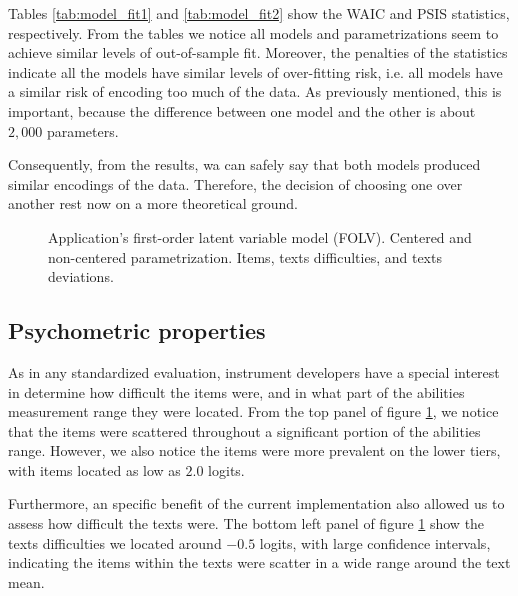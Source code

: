 Tables \ref{tab:model_fit1} and \ref{tab:model_fit2} show the WAIC and PSIS statistics, respectively. From the tables we notice all models and parametrizations seem to achieve similar levels of out-of-sample fit. Moreover, the penalties of the statistics indicate all the models have similar levels of over-fitting risk, i.e. all models have a similar risk of encoding too much of the data. As previously mentioned, this is important, because the difference between one model and the other is about $2,000$ parameters.

Consequently, from the results, wa can safely say that both models produced similar encodings of the data. Therefore, the decision of choosing one over another rest now on a more theoretical ground.

%
\begin{figure}[H]
	\centering
	\begin{subfigure}
		\texttt{[image: FOLV\_recovery\_items]}
	\end{subfigure}
	\begin{subfigure}
		\texttt{[image: FOLV\_recovery\_texts]}
	\end{subfigure}
	\caption[Application's first-order latent variable model (FOLV). Centered and non-centered parametrization. Items, and texts difficulties, and texts deviations.]%
	{Application's first-order latent variable model (FOLV). Centered and non-centered parametrization. Items, texts difficulties, and texts deviations.}
	\label{fig:FOLV_CE.NC_recovery}
\end{figure}

\subsection{Psychometric properties}

As in any standardized evaluation, instrument developers have a special interest in determine how difficult the items were, and in what part of the abilities measurement range they were located. From the top panel of figure \ref{fig:FOLV_CE.NC_recovery}, we notice that the items were scattered throughout a significant portion of the abilities range. However, we also notice the items were more prevalent on the lower tiers, with items located as low as $2.0$ logits.

Furthermore, an specific benefit of the current implementation also allowed us to assess how difficult the texts were. The bottom left panel of figure \ref{fig:FOLV_CE.NC_recovery} show the texts difficulties we located around $-0.5$ logits, with large confidence intervals, indicating the items within the texts were scatter in a wide range around the text mean.

